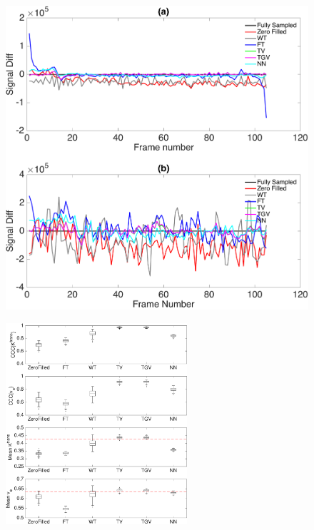 \documentclass{beamer}
\begin{document}
\begin{frame}
	\begin{figure}[htbp]
\centerline{\includegraphics[width=1.1\textwidth]{figure6_up.pdf}}
\end{figure}
\end{frame}

\begin{frame}
\begin{figure}[htbp]
\centerline{
    \includegraphics[width=0.6\textwidth]{../img/qetsr/figure7.eps}
}
\end{figure}
\end{frame}
\end{document}
